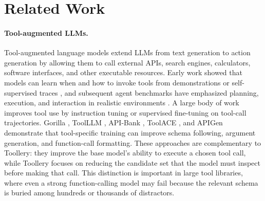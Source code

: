 \section{Related Work}
\label{sec:related_work}

\paragraph{Tool-augmented LLMs.}
Tool-augmented language models extend LLMs from text generation to action generation by allowing them to call external APIs, search engines, calculators, software interfaces, and other executable resources. Early work showed that models can learn when and how to invoke tools from demonstrations or self-supervised traces \citep{schick2023toolformer, yao2022react}, and subsequent agent benchmarks have emphasized planning, execution, and interaction in realistic environments \citep{yao2022webshop, huang2024planning}. A large body of work improves tool use by instruction tuning or supervised fine-tuning on tool-call trajectories. Gorilla \citep{patil2024gorilla}, ToolLLM \citep{qin2023toolllm}, API-Bank \citep{li-etal-2023-api}, ToolACE \citep{liu2024toolace}, and APIGen \citep{liu2024apigen} demonstrate that tool-specific training can improve schema following, argument generation, and function-call formatting. These approaches are complementary to Toollery: they improve the base model's ability to execute a chosen tool call, while Toollery focuses on reducing the candidate set that the model must inspect before making that call. This distinction is important in large tool libraries, where even a strong function-calling model may fail because the relevant schema is buried among hundreds or thousands of distractors.

